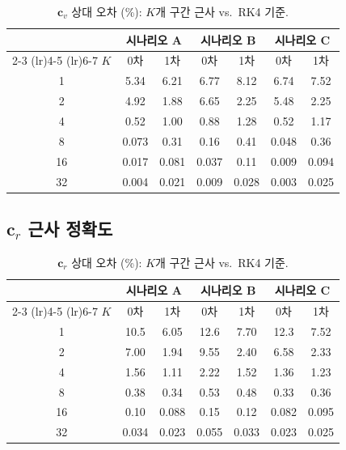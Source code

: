 \documentclass[11pt]{article}
\begin{document}
\begin{table}[h]
\centering
\caption{$\mathbf{c}_v$ 상대 오차 (\%): $K$개 구간 근사 vs.\ RK4 기준.}
\label{tab:cv-accuracy}
\small
\begin{tabular}{@{}c cc cc cc@{}}
\toprule
 & \multicolumn{2}{c}{시나리오 A} & \multicolumn{2}{c}{시나리오 B} & \multicolumn{2}{c}{시나리오 C} \\
\cmidrule(lr){2-3} \cmidrule(lr){4-5} \cmidrule(lr){6-7}
$K$ & 0차 & 1차 & 0차 & 1차 & 0차 & 1차 \\
\midrule
1  & 5.34 & 6.21 & 6.77 & 8.12 & 6.74 & 7.52 \\
2  & 4.92 & 1.88 & 6.65 & 2.25 & 5.48 & 2.25 \\
4  & 0.52 & 1.00 & 0.88 & 1.28 & 0.52 & 1.17 \\
8  & 0.073 & 0.31 & 0.16 & 0.41 & 0.048 & 0.36 \\
16 & 0.017 & 0.081 & 0.037 & 0.11 & 0.009 & 0.094 \\
32 & 0.004 & 0.021 & 0.009 & 0.028 & 0.003 & 0.025 \\
\bottomrule
\end{tabular}
\end{table}

\subsection{$\mathbf{c}_r$ 근사 정확도}

\begin{table}[h]
\centering
\caption{$\mathbf{c}_r$ 상대 오차 (\%): $K$개 구간 근사 vs.\ RK4 기준.}
\label{tab:cr-accuracy}
\small
\begin{tabular}{@{}c cc cc cc@{}}
\toprule
 & \multicolumn{2}{c}{시나리오 A} & \multicolumn{2}{c}{시나리오 B} & \multicolumn{2}{c}{시나리오 C} \\
\cmidrule(lr){2-3} \cmidrule(lr){4-5} \cmidrule(lr){6-7}
$K$ & 0차 & 1차 & 0차 & 1차 & 0차 & 1차 \\
\midrule
1  & 10.5 & 6.05 & 12.6 & 7.70 & 12.3 & 7.52 \\
2  & 7.00 & 1.94 & 9.55 & 2.40 & 6.58 & 2.33 \\
4  & 1.56 & 1.11 & 2.22 & 1.52 & 1.36 & 1.23 \\
8  & 0.38 & 0.34 & 0.53 & 0.48 & 0.33 & 0.36 \\
16 & 0.10 & 0.088 & 0.15 & 0.12 & 0.082 & 0.095 \\
32 & 0.034 & 0.023 & 0.055 & 0.033 & 0.023 & 0.025 \\
\bottomrule
\end{tabular}
\end{table}
\end{document}
